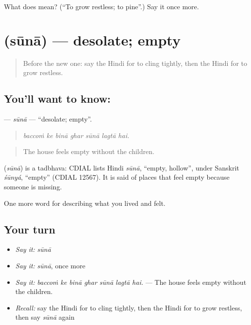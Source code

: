\begin{tcolorbox}[breakable,colback=teal!4,colframe=teal!35!black,title={Before you move on}]
What does  mean? (\textquotedblleft{}To grow restless; to pine\textquotedblright{}.) Say it once more.
\end{tcolorbox}
\section[\texorpdfstring{\hi{सूना} (sūnā)}{सूना (sūnā)}]{ (sūnā) — desolate; empty}

\label{lesson:HI-C460-suna}



\begin{quote}
Before the new one: say the Hindi for to cling tightly, then the Hindi for to grow restless.
\end{quote}

\subsection*{You'll want to know: }
\textbf{} — \emph{sūnā} — \textquotedblleft{}desolate; empty\textquotedblright{}.

\begin{quote}
      
\end{quote}

\begin{quote}
\emph{baccoṁ ke binā ghar sūnā lagtā hai.}
\end{quote}

\begin{quote}
The house feels empty without the children.
\end{quote}

\begin{cousinweb}
\textbf{} (\emph{sūnā}) is a tadbhava: CDIAL lists Hindi \emph{sūnā}, \textquotedblleft{}empty, hollow\textquotedblright{}, under Sanskrit \emph{śūnyá}, \textquotedblleft{}empty\textquotedblright{} (CDIAL 12567). It is said of places that feel empty because someone is missing.
\end{cousinweb}

\begin{grammarlens}[title={What you've built}]
One more word for describing what you lived and felt.
\end{grammarlens}

\subsection*{Your turn}
\begin{itemize}
\raggedright
  \item \emph{Say it:} \emph{sūnā}
  \item \emph{Say it:} \emph{sūnā}, once more
  \item \emph{Say it:} \emph{baccoṁ ke binā ghar sūnā lagtā hai.} — The house feels empty without the children.
  \item \emph{Recall:} say the Hindi for to cling tightly, then the Hindi for to grow restless, then say \emph{sūnā} again
\end{itemize}

